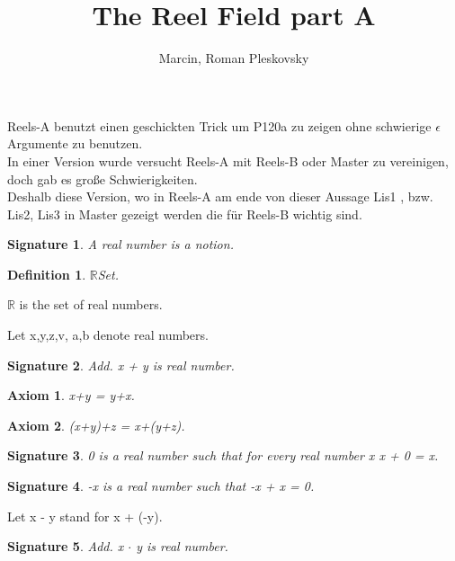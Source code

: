 \documentclass{article}
\newenvironment{forthel}{\begin{leftbar}}{\end{leftbar}}
\newtheorem{axiom}{Axiom}
\newtheorem{definition}{Definition}
\newtheorem{signature}{Signature}
\begin{document}
\title{The Reel Field part A}
\author{Marcin, Roman Pleskovsky}
\maketitle

Reels-A benutzt einen geschickten Trick um P120a zu zeigen ohne schwierige $\epsilon$ Argumente zu benutzen.\\
In einer Version wurde versucht Reels-A mit Reels-B oder Master zu vereinigen, doch gab es gro\ss e Schwierigkeiten.\\
Deshalb diese Version, wo in Reels-A am ende von dieser Aussage Lis1 , bzw. Lis2, Lis3 in Master gezeigt werden die f\"ur Reels-B wichtig sind.\\ 

\begin{forthel}
[set/-s] [element/-s] [number/-s]

\begin{signature} A real number is a notion.

\end{signature}

\begin{definition} $\mathbb{R}$Set.

\end{definition}
$\mathbb{R}$ is the set of real numbers.

Let x,y,z,v, a,b denote real numbers.



\begin{signature} Add. x + y is real number.

\end{signature}
\begin{axiom} x+y = y+x.

\end{axiom}
\begin{axiom} (x+y)+z = x+(y+z).

\end{axiom}
\begin{signature} 0 is a real number such that for every real number x x + 0 = x.

\end{signature}
\begin{signature} -x is a real number such that -x + x = 0.

\end{signature}

Let x - y stand for x + (-y).

\begin{signature} Add. x $\cdot$ y is real number.


\end{signature}
\end{forthel}
\end{document}
